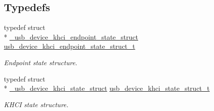 \subsection*{Typedefs}
\begin{DoxyCompactItemize}
\item 
typedef struct \\*
\hyperlink{struct__usb__device__khci__endpoint__state__struct}{\-\_\-usb\-\_\-device\-\_\-khci\-\_\-endpoint\-\_\-state\-\_\-struct} \hyperlink{group__usb__device__controller__khci__driver_ga78d53188f22fcd0f4058fafea867d1df}{usb\-\_\-device\-\_\-khci\-\_\-endpoint\-\_\-state\-\_\-struct\-\_\-t}
\begin{DoxyCompactList}\small\item\em Endpoint state structure. \end{DoxyCompactList}\item 
typedef struct \\*
\hyperlink{struct__usb__device__khci__state__struct}{\-\_\-usb\-\_\-device\-\_\-khci\-\_\-state\-\_\-struct} \hyperlink{group__usb__device__controller__khci__driver_ga0132f753d6b7c62680d20f8a1926d825}{usb\-\_\-device\-\_\-khci\-\_\-state\-\_\-struct\-\_\-t}
\begin{DoxyCompactList}\small\item\em K\-H\-C\-I state structure. \end{DoxyCompactList}\end{DoxyCompactItemize}

